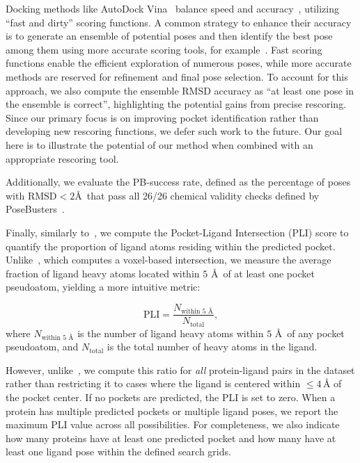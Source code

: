 \documentclass[10pt,conference]{IEEEtran}
\begin{document}
Docking methods like AutoDock Vina~\cite{eberhardt2021autodock} balance speed and accuracy~\cite{su2018comparative}, utilizing ``fast and dirty'' scoring functions. A common strategy to enhance their accuracy is to generate an ensemble of potential poses and then identify the best pose among them using more accurate scoring tools, for example~\cite{li2017delphiscorer,shen2022boosting}. Fast scoring functions enable the efficient exploration of numerous poses, while more accurate methods are reserved for refinement and final pose selection. To account for this approach, we also compute the ensemble RMSD accuracy as ``at least one pose in the ensemble is correct'', highlighting the potential gains from precise rescoring. Since our primary focus is on improving pocket identification rather than developing new rescoring functions, we defer such work to the future. Our goal here is to illustrate the potential of our method when combined with an appropriate rescoring tool.

Additionally, we evaluate the PB-success rate, defined as the percentage of poses with $\text{RMSD} < 2$\AA\ that pass all 26/26 chemical validity checks defined by PoseBusters~\cite{Buttenschoen2024}.

Finally, similarly to~\cite{kandel2021puresnet}, we compute the Pocket-Ligand Intersection (PLI) score to quantify the proportion of ligand atoms residing within the predicted pocket. Unlike~\cite{kandel2021puresnet}, which computes a voxel-based intersection, we measure the average fraction of ligand heavy atoms located within $5$ \AA\ of at least one pocket pseudoatom, yielding a more intuitive metric:



\begin{equation}
\text{PLI} = \frac{N_{\text{within 5 \AA}}}{N_{\text{total}}},
\end{equation}
where $N_{\text{within 5 \AA}}$ is the number of ligand heavy atoms within $5$ \AA\ of any pocket pseudoatom, and $N_{\text{total}}$ is the total number of heavy atoms in the ligand.

However, unlike~\cite{kandel2021puresnet}, we compute this ratio for \textit{all} protein-ligand pairs in the dataset rather than restricting it to cases where the ligand is centered within $\le 4\,\text{\AA}$ of the pocket center. If no pockets are predicted, the PLI is set to zero. When a protein has multiple predicted pockets or multiple ligand poses, we report the maximum PLI value across all possibilities. For completeness, we also indicate how many proteins have at least one predicted pocket and how many have at least one ligand pose within the defined search grids.
\end{document}
